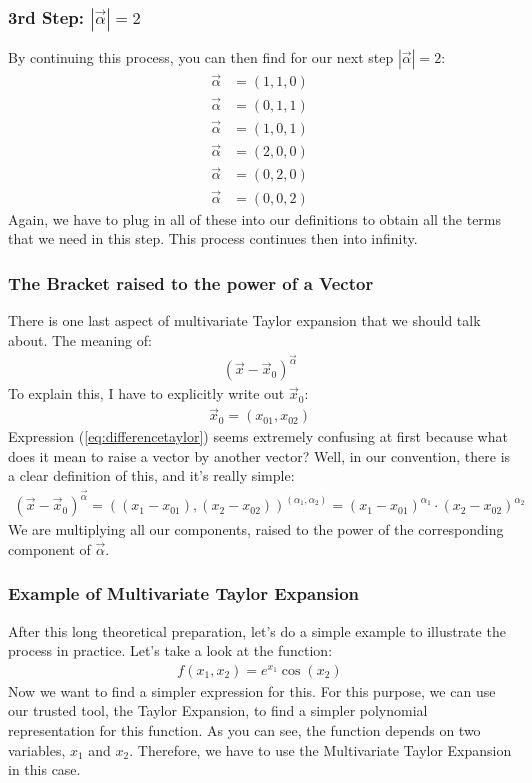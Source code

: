 \subsubsection*{3rd Step: $|\vec{\alpha}|=2$}
By continuing this process, you can then find for our next step $|\vec{\alpha}|=2$: 
\begin{align}
	\vec{\alpha} &= (1,1,0) \\
	\vec{\alpha} &= (0,1,1) \\
	\vec{\alpha} &= (1,0,1) \\
	\vec{\alpha} &= (2,0,0) \\
	\vec{\alpha} &= (0,2,0) \\
	\vec{\alpha} &= (0,0,2)
\end{align}
Again, we have to plug in all of these into our definitions to obtain all the terms that we need in this step. 
This process continues then into infinity.

\subsubsection*{The Bracket raised to the power of a Vector}
There is one last aspect of multivariate Taylor expansion that we should talk about. The meaning of:
\begin{align}\label{eq:differencetaylor}
	(\vec{x}-\vec{x}_0)^{\vec{\alpha}}
\end{align}
To explain this, I have to explicitly write out $\vec{x}_0$:
\begin{align}
	\vec{x}_0=(x_{01}, x_{02})
\end{align}
Expression (\ref{eq:differencetaylor}) seems extremely confusing at first because what does it mean to raise a vector by another vector? Well, in our convention, there is a clear definition of this, and it's really simple:
\begin{align}
	(\vec{x}-\vec{x}_0)^{\vec{\alpha}} = \left((x_1-x_{01}), (x_2-x_{02})\right)^{(\alpha_1, \alpha_2)} = (x_1-x_{01})^{\alpha_1}\cdot(x_2-x_{02})^{\alpha_2}
\end{align}
We are multiplying all our components, raised to the power of the corresponding component of $\vec{\alpha}$.

\subsubsection*{Example of Multivariate Taylor Expansion}
After this long theoretical preparation, let's do a simple example to illustrate the process in practice.
Let's take a look at the function:
\begin{align}
	f(x_1,x_2) = e^{x_1} \cos(x_2)    
\end{align}
Now we want to find a simpler expression for this. For this purpose, we can use our trusted tool, the Taylor Expansion, to find a simpler polynomial representation for this function. As you can see, the function depends on two variables, $x_1$ and $x_2$. Therefore, we have to use the Multivariate Taylor Expansion in this case.

